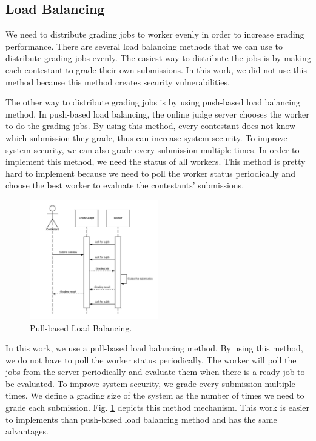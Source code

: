 \documentclass[conference,a4paper]{IEEEtran}
\begin{document}
\subsection{Load Balancing}

We need to distribute grading jobs to worker evenly in order to increase grading performance. There are several load balancing methods that we can use to distribute grading jobs evenly. The easiest way to distribute the jobs is by making each contestant to grade their own submissions. In this work, we did not use this method because this method creates security vulnerabilities.

The other way to distribute grading jobs is by using push-based load balancing method. In push-based load balancing, the online judge server chooses the worker to do the grading jobs. By using this method, every contestant does not know which submission they grade, thus can increase system security. To improve system security, we can also grade every submission multiple times. In order to implement this method, we need the status of all workers. This method is pretty hard to implement because we need to poll the worker status periodically and choose the best worker to evaluate the contestants' submissions.

\begin{figure}[htbp]
\centerline{\includegraphics[width=0.5\textwidth]{images/paper-pull-based-load-balancing.jpeg}}
\caption{Pull-based Load Balancing.}
\label{pull-based-load-balancing}
\end{figure}

In this work, we use a pull-based load balancing method. By using this method, we do not have to poll the worker status periodically. The worker will poll the jobs from the server periodically and evaluate them when there is a ready job to be evaluated. To improve system security, we grade every submission multiple times. We define a grading size of the system as the number of times we need to grade each submission. Fig. \ref{pull-based-load-balancing} depicts this method mechanism. This work is easier to implements than push-based load balancing method and has the same advantages.
\end{document}
